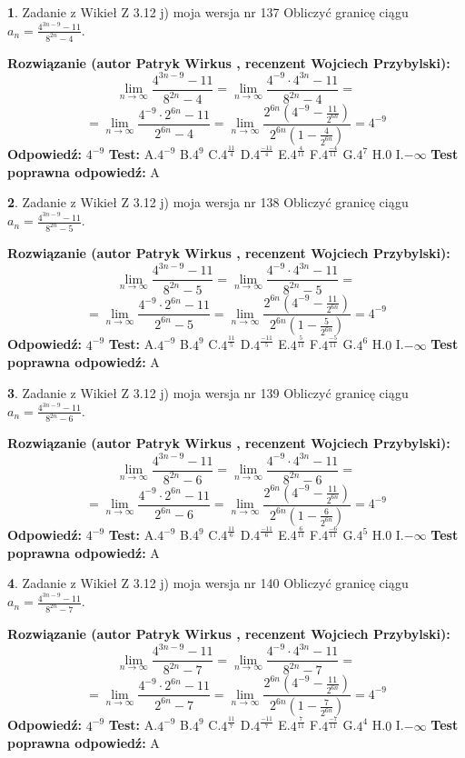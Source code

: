 \documentclass[12pt, a4paper]{article}
\theoremstyle{definition} %
\newtheorem{zad}{}
\newcommand{\zadStart}[1]{\begin{zad}#1\newline}
\newcommand{\zadStop}{\end{zad}}
\newcommand{\rozwStart}[2]{\noindent \textbf{Rozwiązanie (autor #1 , recenzent #2): }\newline}
\newcommand{\rozwStop}{\newline}
\newcommand{\odpStart}{\noindent \textbf{Odpowiedź:}\newline}
\newcommand{\odpStop}{\newline}
\newcommand{\testStart}{\noindent \textbf{Test:}\newline}
\newcommand{\testStop}{\newline}
\newcommand{\kluczStart}{\noindent \textbf{Test poprawna odpowiedź:}\newline}
\newcommand{\kluczStop}{\newline}
\begin{document}
\zadStart{Zadanie z Wikieł Z 3.12 j) moja wersja nr 137}
Obliczyć granicę ciągu $a_{n}=\frac{4^{3n-9}-11}{8^{2n}-4}$.
\zadStop
\rozwStart{Patryk Wirkus}{Wojciech Przybylski}
$$\lim\limits_{n\to\infty}\frac{4^{3n-9}-11}{8^{2n}-4}= \lim\limits_{n\to\infty}\frac{4^{-9} \cdot 4^{3n}-11}{8^{2n}-4}=$$
$$= \lim\limits_{n\to\infty}\frac{4^{-9} \cdot 2^{6n}-11}{2^{6n}-4}= \lim\limits_{n\to\infty}\frac{2^{6n}(4^{-9} - \frac{11}{2^{6n}})}{2^{6n}(1-\frac{4}{2^{6n}})}= 4^{-9}$$
\rozwStop
\odpStart
$4^{-9}$
\odpStop
\testStart
A.$4^{-9}$
B.$4^{9}$
C.$4^{\frac{11}{4}}$
D.$4^{\frac{-11}{4}}$
E.$4^{\frac{4}{11}}$
F.$4^{\frac{-4}{11}}$
G.$4^{7}$
H.$0$
I.$-\infty$
\testStop
\kluczStart
A
\kluczStop



\zadStart{Zadanie z Wikieł Z 3.12 j) moja wersja nr 138}
Obliczyć granicę ciągu $a_{n}=\frac{4^{3n-9}-11}{8^{2n}-5}$.
\zadStop
\rozwStart{Patryk Wirkus}{Wojciech Przybylski}
$$\lim\limits_{n\to\infty}\frac{4^{3n-9}-11}{8^{2n}-5}= \lim\limits_{n\to\infty}\frac{4^{-9} \cdot 4^{3n}-11}{8^{2n}-5}=$$
$$= \lim\limits_{n\to\infty}\frac{4^{-9} \cdot 2^{6n}-11}{2^{6n}-5}= \lim\limits_{n\to\infty}\frac{2^{6n}(4^{-9} - \frac{11}{2^{6n}})}{2^{6n}(1-\frac{5}{2^{6n}})}= 4^{-9}$$
\rozwStop
\odpStart
$4^{-9}$
\odpStop
\testStart
A.$4^{-9}$
B.$4^{9}$
C.$4^{\frac{11}{5}}$
D.$4^{\frac{-11}{5}}$
E.$4^{\frac{5}{11}}$
F.$4^{\frac{-5}{11}}$
G.$4^{6}$
H.$0$
I.$-\infty$
\testStop
\kluczStart
A
\kluczStop



\zadStart{Zadanie z Wikieł Z 3.12 j) moja wersja nr 139}
Obliczyć granicę ciągu $a_{n}=\frac{4^{3n-9}-11}{8^{2n}-6}$.
\zadStop
\rozwStart{Patryk Wirkus}{Wojciech Przybylski}
$$\lim\limits_{n\to\infty}\frac{4^{3n-9}-11}{8^{2n}-6}= \lim\limits_{n\to\infty}\frac{4^{-9} \cdot 4^{3n}-11}{8^{2n}-6}=$$
$$= \lim\limits_{n\to\infty}\frac{4^{-9} \cdot 2^{6n}-11}{2^{6n}-6}= \lim\limits_{n\to\infty}\frac{2^{6n}(4^{-9} - \frac{11}{2^{6n}})}{2^{6n}(1-\frac{6}{2^{6n}})}= 4^{-9}$$
\rozwStop
\odpStart
$4^{-9}$
\odpStop
\testStart
A.$4^{-9}$
B.$4^{9}$
C.$4^{\frac{11}{6}}$
D.$4^{\frac{-11}{6}}$
E.$4^{\frac{6}{11}}$
F.$4^{\frac{-6}{11}}$
G.$4^{5}$
H.$0$
I.$-\infty$
\testStop
\kluczStart
A
\kluczStop



\zadStart{Zadanie z Wikieł Z 3.12 j) moja wersja nr 140}
Obliczyć granicę ciągu $a_{n}=\frac{4^{3n-9}-11}{8^{2n}-7}$.
\zadStop
\rozwStart{Patryk Wirkus}{Wojciech Przybylski}
$$\lim\limits_{n\to\infty}\frac{4^{3n-9}-11}{8^{2n}-7}= \lim\limits_{n\to\infty}\frac{4^{-9} \cdot 4^{3n}-11}{8^{2n}-7}=$$
$$= \lim\limits_{n\to\infty}\frac{4^{-9} \cdot 2^{6n}-11}{2^{6n}-7}= \lim\limits_{n\to\infty}\frac{2^{6n}(4^{-9} - \frac{11}{2^{6n}})}{2^{6n}(1-\frac{7}{2^{6n}})}= 4^{-9}$$
\rozwStop
\odpStart
$4^{-9}$
\odpStop
\testStart
A.$4^{-9}$
B.$4^{9}$
C.$4^{\frac{11}{7}}$
D.$4^{\frac{-11}{7}}$
E.$4^{\frac{7}{11}}$
F.$4^{\frac{-7}{11}}$
G.$4^{4}$
H.$0$
I.$-\infty$
\testStop
\kluczStart
A
\kluczStop
\end{document}
